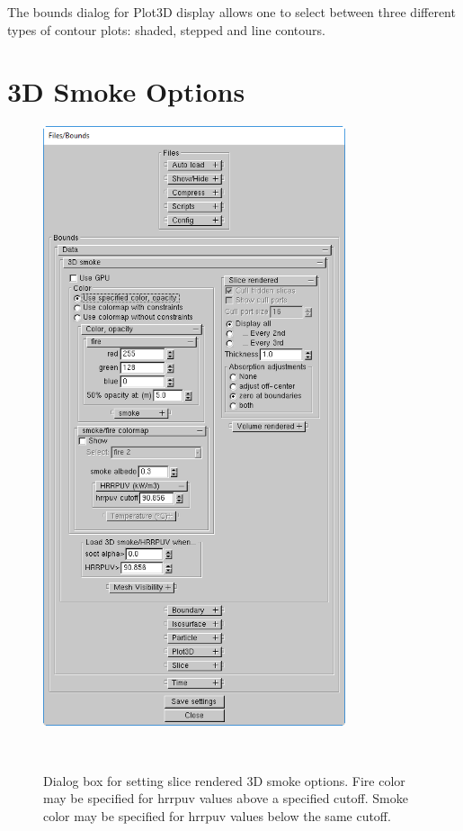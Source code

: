\documentclass[11pt,twoside]{book}
\begin{document}
The bounds dialog for Plot3D display allows one to select between
three different types of contour plots:  shaded, stepped and line
contours.

\section{3D Smoke Options}
\begin{figure}[bph]
\centerline{\includegraphics[width=3.5in]{FIGURES/fig3DSmoke}
}\ \caption[Dialog Box for setting slice rendered 3D smoke options]
{Dialog box for setting slice rendered 3D smoke options.  Fire color may be specified for hrrpuv values above a specified cutoff.
Smoke color may be specified for hrrpuv values below the same cutoff. }
\label{fig3DSmoke}
\end{figure}
\end{document}
